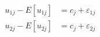 \documentclass[border=1pt]{standalone}
\begin{document}
$\displaystyle \begin{aligned}u_{1j}-E[u_{1j}]&=c_j+\varepsilon_{1j}\\u_{2j}-E[u_{2j}]&=c_j+\varepsilon_{2j}\end{aligned}$
\end{document}
